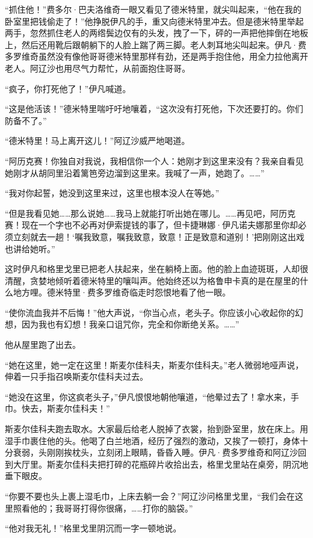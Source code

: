 \par “抓住他！”费多尔·巴夫洛维奇一眼又看见了德米特里，就尖叫起来，“他在我的卧室里把钱偷走了！”他挣脱伊凡的手，重又向德米特里冲去。但是德米特里举起两手，忽然抓住老人的两绺鬓边仅有的头发，拽了一下，砰的一声把他摔倒在地板上，然后还用靴后跟朝躺下的人脸上踹了两三脚。老人刺耳地尖叫起来。伊凡·费多罗维奇虽然没有像他哥哥德米特里那样有劲，还是两手抱住他，用全力拉他离开老人。阿辽沙也用尽气力帮忙，从前面抱住哥哥。
\par “疯子，你打死他了！”伊凡喊道。
\par “这是他活该！”德米特里喘吁吁地嚷着，“这次没有打死他，下次还要打的。你们防备不了。”
\par “德米特里！马上离开这儿！”阿辽沙威严地喝道。
\par “阿历克赛！你独自对我说，我相信你一个人：她刚才到这里来没有？我亲自看见她刚才从胡同里沿着篱笆旁边溜到这里来。我喊了一声，她跑了。……”
\par “我对你起誓，她没到这里来过，这里也根本没人在等她。”
\par “但是我看见她……那么说她……我马上就能打听出她在哪儿。……再见吧，阿历克赛！现在一个字也不必再对伊索提钱的事了，但卡捷琳娜·伊凡诺夫娜那里你却必须立刻就去一趟！‘嘱我致意，嘱我致意，致意！正是致意和道别！’把刚刚这出戏也讲给她听。”
\par 这时伊凡和格里戈里已把老人扶起来，坐在躺椅上面。他的脸上血迹斑斑，人却很清醒，贪婪地倾听着德米特里的嚷叫声。他始终还以为格鲁申卡真的是在屋里的什么地方哩。德米特里·费多罗维奇临走时怨恨地看了他一眼。
\par “使你流血我并不后悔！”他大声说，“你当心点，老头子。你应该小心收起你的幻想，因为我也有幻想！我亲口诅咒你，完全和你断绝关系。……”
\par 他从屋里跑了出去。
\par “她在这里，她一定在这里！斯麦尔佳科夫，斯麦尔佳科夫。”老人微弱地哑声说，伸着一只手指召唤斯麦尔佳科夫过去。
\par “她没在这里，你这疯老头子，”伊凡恨恨地朝他嚷道，“他晕过去了！拿水来，手巾。快去，斯麦尔佳科夫！”
\par 斯麦尔佳科夫跑去取水。大家最后给老人脱掉了衣裳，抬到卧室里，放在床上。用湿手巾裹住他的头。他喝了白兰地酒，经历了强烈的激动，又挨了一顿打，身体十分衰弱，头刚刚挨枕头，立刻闭上眼睛，昏昏入睡。伊凡·费多罗维奇和阿辽沙回到大厅里。斯麦尔佳科夫把打碎的花瓶碎片收拾出去，格里戈里站在桌旁，阴沉地垂下眼皮。
\par “你要不要也头上裹上湿毛巾，上床去躺一会？”阿辽沙问格里戈里，“我们会在这里照看他的；我哥哥打得你很痛，……打你的脑袋。”
\par “他对我无礼！”格里戈里阴沉而一字一顿地说。
